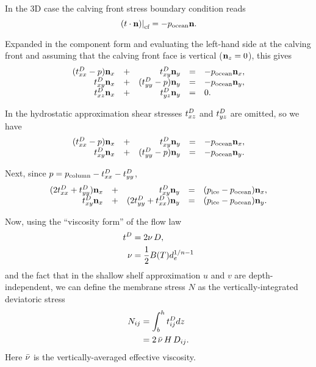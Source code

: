 \documentclass[11pt]{article}
\begin{document}
In the 3D case the calving front stress boundary condition reads
\begin{equation*}
\left.\left( t \cdot \mathbf{n} \right)\right|_{\text{cf}} = -p_{\text{ocean}} \mathbf{n}.
\end{equation*}

Expanded in the component form and evaluating the left-hand side at
the calving front and assuming that the calving front face is vertical
($\mathbf{n}_{z} = 0$), this gives
\begin{equation*}
\begin{array}{rcrcl}
(t^{D}_{xx} - p) \mathbf{n}_{x} &+& t^{D}_{xy} \mathbf{n}_{y} &=& -p_{\text{ocean}} \mathbf{n}_{x},\\
t^{D}_{xy} \mathbf{n}_{x} &+& (t^{D}_{yy} - p) \mathbf{n}_{y} &=& -p_{\text{ocean}}  \mathbf{n}_{y},\\
t^{D}_{xz} \mathbf{n}_{x} &+& t^{D}_{yz} \mathbf{n}_{y} &=& 0.
\end{array}
\end{equation*}

In the hydrostatic approximation shear stresses $t^{D}_{xz}$ and $t^{D}_{yz}$ are omitted, so we have
\begin{equation*}
\begin{array}{rcrcl}
(t^{D}_{xx} - p) \mathbf{n}_{x} &+& t^{D}_{xy} \mathbf{n}_{y} &=& -p_{\text{ocean}} \mathbf{n}_{x},\\
t^{D}_{xy} \mathbf{n}_{x} &+& (t^{D}_{yy} - p) \mathbf{n}_{y} &=& -p_{\text{ocean}}  \mathbf{n}_{y}.\\
\end{array}
\end{equation*}

Next, since $p = p_{\text{column}} - t^{D}_{xx} - t^{D}_{yy}$,
\begin{equation}
\label{eq:1}
\begin{array}{rcrcl}
(2t^{D}_{xx} + t^{D}_{yy}) \mathbf{n}_{x} &+& t^{D}_{xy} \mathbf{n}_{y} &=& (p_{\text{ice}} - p_{\text{ocean}}) \mathbf{n}_{x},\\
t^{D}_{xy} \mathbf{n}_{x} &+& (2t^{D}_{yy} + t^{D}_{xx}) \mathbf{n}_{y} &=& (p_{\text{ice}} - p_{\text{ocean}}) \mathbf{n}_{y}.\\
\end{array}
\end{equation}

Now, using the ``viscosity form'' of the flow law
\begin{align*}
t^{D}_{} &= 2\nu\, D,\\
\nu &= \frac 12 B(T) d_{e}^{1/n-1}
\end{align*}
and the fact that in the shallow shelf approximation $u$ and $v$ are
depth-independent, we can define the membrane stress $N$ as the
vertically-integrated deviatoric stress
\begin{align*}
N_{ij} &= \int_{b}^{h} t^{D}_{ij} dz\\
&= 2\, \bar {\nu}\, H\, D_{ij}.\notag
\end{align*}
Here $\bar {\nu}$ is the vertically-averaged effective viscosity.
\end{document}
